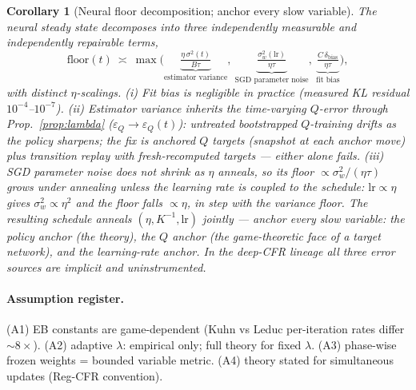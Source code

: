 \documentclass{article}
\newtheorem{corollary}{Corollary}
\begin{document}
\begin{corollary}[Neural floor decomposition; anchor every slow variable]
\label{cor:etastar}
The neural steady state decomposes into three independently measurable
and independently repairable terms,
\[
  \mathrm{floor}(t)\ \asymp\
  \max\Big(
  \underbrace{\tfrac{\eta\,\sigma^2(t)}{B\tau}}_{\text{estimator variance}},\
  \underbrace{\tfrac{\sigma_w^2(\mathrm{lr})}{\eta\tau}}_{\text{SGD parameter noise}},\
  \underbrace{\tfrac{C\,\delta_{\mathrm{bias}}}{\eta\tau}}_{\text{fit bias}}
  \Big),
\]
with distinct $\eta$-scalings.
(i) \emph{Fit bias} is negligible in practice (measured KL residual
$10^{-4}$--$10^{-7}$).
(ii) \emph{Estimator variance} inherits the time-varying $Q$-error
through Prop.~\ref{prop:lambda} ($\varepsilon_Q\!\to\!\varepsilon_Q(t)$):
untreated bootstrapped $Q$-training drifts as the policy sharpens; the
fix is anchored $Q$ targets (snapshot at each anchor move) \emph{plus}
transition replay with fresh-recomputed targets --- either alone fails.
(iii) \emph{SGD parameter noise} does not shrink as $\eta$ anneals, so
its floor $\propto \sigma_w^2/(\eta\tau)$ grows under annealing unless
the learning rate is coupled to the schedule:
$\mathrm{lr}\propto\eta$ gives $\sigma_w^2\propto\eta^2$ and the floor
falls $\propto\eta$, in step with the variance floor.
The resulting schedule anneals $(\eta, K^{-1}, \mathrm{lr})$ jointly ---
\emph{anchor every slow variable}: the policy anchor (the theory), the
$Q$ anchor (the game-theoretic face of a target network), and the
learning-rate anchor.  In the deep-CFR lineage all three error sources
are implicit and uninstrumented.
\end{corollary}

\paragraph{Assumption register.}
(A1) EB constants are game-dependent (Kuhn vs Leduc per-iteration rates
differ $\sim 8\times$).  (A2) adaptive $\lambda$: empirical only; full
theory for fixed $\lambda$.  (A3) phase-wise frozen weights = bounded
variable metric.  (A4) theory stated for simultaneous updates
(Reg-CFR convention).
\end{document}
